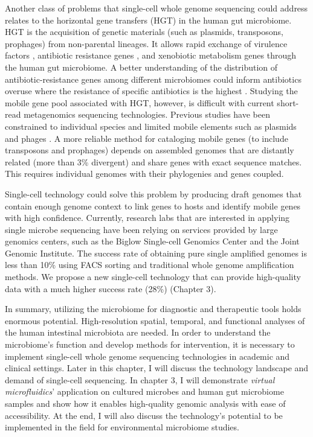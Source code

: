 Another class of problems that single-cell whole genome sequencing could address relates to the horizontal gene transfers (HGT) in the human gut microbiome. HGT is the acquisition of genetic materials (such as plasmids, transposons, prophages) from non-parental lineages. It allows rapid exchange of virulence factors \cite{Chen:2009cr}, antibiotic resistance genes \cite{Smillie:2011jc,Brito:2016cd}, and xenobiotic metabolism genes \cite{Hehemann:2010wk} through the human gut microbiome. A better understanding of the distribution of antibiotic-resistance genes among different microbiomes could inform antibiotics overuse where the resistance of specific antibiotics is the highest \cite{Brito:2016cd}. Studying the mobile gene pool associated with HGT, however, is difficult with current short-read metagenomics sequencing technologies. Previous studies have been constrained to individual species \cite{Coyne:2014ez} and limited mobile elements such as plasmids \cite{Jones:2010js} and phages \cite{Breitbart:2003uf}. A more reliable method for cataloging mobile genes (to include transposons and prophages) depends on assembled genomes that are distantly related (more than 3\% divergent) and share genes with exact sequence matches. This requires individual genomes with their phylogenies and genes coupled. 

Single-cell technology could solve this problem by producing draft genomes that contain enough genome context to link genes to hosts and identify mobile genes with high confidence. Currently, research labs that are interested in applying single microbe sequencing have been relying on services provided by large genomics centers, such as the Biglow Single-cell Genomics Center and the Joint Genomic Institute. The success rate of obtaining pure single amplified genomes is less than 10\% using FACS sorting and traditional whole genome amplification methods. We propose a new single-cell technology that can provide high-quality data with a much higher success rate (28\%) (Chapter 3). 

In summary, utilizing the microbiome for diagnostic and therapeutic tools holds enormous potential. High-resolution spatial, temporal, and functional analyses of the human intestinal microbiota are needed. In order to understand the microbiome's function and develop methods for intervention, it is necessary to implement single-cell whole genome sequencing technologies in academic and clinical settings. Later in this chapter, I will discuss the technology landscape and demand of single-cell sequencing. In chapter 3, I will demonstrate \textit{virtual microfluidics}' application on cultured microbes and human gut microbiome samples and show how it enables high-quality genomic analysis with ease of accessibility. At the end, I will also discuss the technology's potential to be implemented in the field for environmental microbiome studies. 

